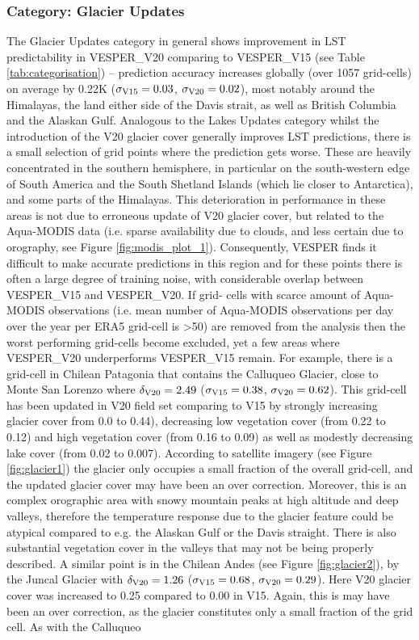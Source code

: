 \documentclass[hess, twostagejnl]{copernicus}
\begin{document}
\subsubsection{Category: Glacier Updates}\label{sec:glacier}
The Glacier Updates category in general shows improvement in LST predictability in VESPER\_V20 comparing to VESPER\_V15 (see  Table  \ref{tab:categorisation})  –  prediction  accuracy  increases  globally  (over  1057  grid-cells)  on  average  by  0.22K  ($\sigma_{\rm V15} = 0.03$, $\sigma_{\rm V20} = 0.02$), most notably around the Himalayas, the land either side of the Davis strait, as well as British Columbia and the Alaskan Gulf. Analogous to the Lakes Updates category whilst the introduction of the V20 glacier cover generally improves LST predictions, there is a small selection of grid points where the prediction gets worse. These are heavily concentrated  in  the  southern  hemisphere,  in  particular  on  the  south-western  edge  of  South  America  and  the  South Shetland Islands (which lie closer to Antarctica), and some parts of the Himalayas. This deterioration in performance in these areas is not due to erroneous update of V20 glacier cover, but related to the Aqua-MODIS data (i.e. sparse availability due to clouds, and less certain due to orography, see Figure \ref{fig:modis_plot_1}). Consequently, VESPER finds it difficult to make accurate predictions in this region and for these points there is often a large degree of training noise, with considerable overlap between VESPER\_V15 and VESPER\_V20. If grid- cells with scarce amount of Aqua-MODIS observations (i.e. mean number of Aqua-MODIS observations per day over the year per ERA5 grid-cell is >50) are removed from the analysis then the worst performing grid-cells become excluded, yet a few areas where VESPER\_V20 underperforms VESPER\_V15 remain. For  example, there is a grid-cell in Chilean Patagonia that contains the Calluqueo Glacier, close to Monte San Lorenzo where $\delta_{\rm V20} = 2.49$ ($\sigma_{\rm V15} = 0.38$, $\sigma_{\rm V20} = 0.62$). This grid-cell has been updated in V20 field set comparing to V15 by strongly increasing glacier cover from 0.0 to 0.44), decreasing low vegetation cover (from 0.22 to 0.12) and high vegetation cover (from 0.16 to 0.09) as well as modestly decreasing lake cover (from 0.02 to 0.007). According to satellite imagery (see Figure \ref{fig:glacier1}) the glacier only occupies a small fraction of the overall grid-cell, and the updated glacier cover may have been an over correction. Moreover, this is an complex orographic area with snowy mountain peaks at high altitude and deep valleys, therefore the temperature response due to the glacier feature could be atypical compared to e.g. the Alaskan Gulf or the Davis straight. There is also substantial vegetation cover in the valleys that may not be being properly described. A similar point is in the  Chilean Andes (see Figure \ref{fig:glacier2}),  by the Juncal Glacier with $\delta_{\rm V20} = 1.26$ ($\sigma_{\rm V15} = 0.68$, $\sigma_{\rm V20} = 0.29$). Here V20 glacier cover was increased to 0.25 compared to 0.00 in V15. Again, this is may have been an over correction, as the glacier constitutes only a  small fraction of the grid cell. As with the Calluqueo 
\end{document}
